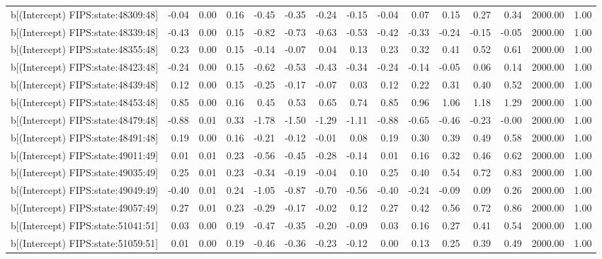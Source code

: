 \begin{table}[ht]
\begin{tabular}{rrrrrrrrrrrrrrr}
  b[(Intercept) FIPS:state:48309:48] & -0.04 & 0.00 & 0.16 & -0.45 & -0.35 & -0.24 & -0.15 & -0.04 & 0.07 & 0.15 & 0.27 & 0.34 & 2000.00 & 1.00 \\ 
  b[(Intercept) FIPS:state:48339:48] & -0.43 & 0.00 & 0.15 & -0.82 & -0.73 & -0.63 & -0.53 & -0.42 & -0.33 & -0.24 & -0.15 & -0.05 & 2000.00 & 1.00 \\ 
  b[(Intercept) FIPS:state:48355:48] & 0.23 & 0.00 & 0.15 & -0.14 & -0.07 & 0.04 & 0.13 & 0.23 & 0.32 & 0.41 & 0.52 & 0.61 & 2000.00 & 1.00 \\ 
  b[(Intercept) FIPS:state:48423:48] & -0.24 & 0.00 & 0.15 & -0.62 & -0.53 & -0.43 & -0.34 & -0.24 & -0.14 & -0.05 & 0.06 & 0.14 & 2000.00 & 1.00 \\ 
  b[(Intercept) FIPS:state:48439:48] & 0.12 & 0.00 & 0.15 & -0.25 & -0.17 & -0.07 & 0.03 & 0.12 & 0.22 & 0.31 & 0.40 & 0.52 & 2000.00 & 1.00 \\ 
  b[(Intercept) FIPS:state:48453:48] & 0.85 & 0.00 & 0.16 & 0.45 & 0.53 & 0.65 & 0.74 & 0.85 & 0.96 & 1.06 & 1.18 & 1.29 & 2000.00 & 1.00 \\ 
  b[(Intercept) FIPS:state:48479:48] & -0.88 & 0.01 & 0.33 & -1.78 & -1.50 & -1.29 & -1.11 & -0.88 & -0.65 & -0.46 & -0.23 & -0.00 & 2000.00 & 1.00 \\ 
  b[(Intercept) FIPS:state:48491:48] & 0.19 & 0.00 & 0.16 & -0.21 & -0.12 & -0.01 & 0.08 & 0.19 & 0.30 & 0.39 & 0.49 & 0.58 & 2000.00 & 1.00 \\ 
  b[(Intercept) FIPS:state:49011:49] & 0.01 & 0.01 & 0.23 & -0.56 & -0.45 & -0.28 & -0.14 & 0.01 & 0.16 & 0.32 & 0.46 & 0.62 & 2000.00 & 1.00 \\ 
  b[(Intercept) FIPS:state:49035:49] & 0.25 & 0.01 & 0.23 & -0.34 & -0.19 & -0.04 & 0.10 & 0.25 & 0.40 & 0.54 & 0.72 & 0.83 & 2000.00 & 1.00 \\ 
  b[(Intercept) FIPS:state:49049:49] & -0.40 & 0.01 & 0.24 & -1.05 & -0.87 & -0.70 & -0.56 & -0.40 & -0.24 & -0.09 & 0.09 & 0.26 & 2000.00 & 1.00 \\ 
  b[(Intercept) FIPS:state:49057:49] & 0.27 & 0.01 & 0.23 & -0.29 & -0.17 & -0.02 & 0.12 & 0.27 & 0.42 & 0.56 & 0.72 & 0.86 & 2000.00 & 1.00 \\ 
  b[(Intercept) FIPS:state:51041:51] & 0.03 & 0.00 & 0.19 & -0.47 & -0.35 & -0.20 & -0.09 & 0.03 & 0.16 & 0.27 & 0.41 & 0.54 & 2000.00 & 1.00 \\ 
  b[(Intercept) FIPS:state:51059:51] & 0.01 & 0.00 & 0.19 & -0.46 & -0.36 & -0.23 & -0.12 & 0.00 & 0.13 & 0.25 & 0.39 & 0.49 & 2000.00 & 1.00 \\ 

\end{tabular}
\end{table}
